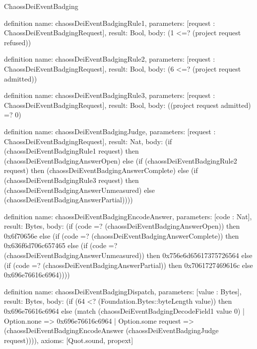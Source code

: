 \begin{lexlean}{ChaossDeiEventBadging}
\begin{semanticmodule}
definition{
  name: chaossDeiEventBadgingRule1,
  parameters: [request : ChaossDeiEventBadgingRequest],
  result: Bool,
  body: (1 <=? (project request refused))
}

definition{
  name: chaossDeiEventBadgingRule2,
  parameters: [request : ChaossDeiEventBadgingRequest],
  result: Bool,
  body: (6 <=? (project request admitted))
}

definition{
  name: chaossDeiEventBadgingRule3,
  parameters: [request : ChaossDeiEventBadgingRequest],
  result: Bool,
  body: ((project request admitted) =? 0)
}

definition{
  name: chaossDeiEventBadgingJudge,
  parameters: [request : ChaossDeiEventBadgingRequest],
  result: Nat,
  body: (if (chaossDeiEventBadgingRule1 request) then (chaossDeiEventBadgingAnswerOpen) else (if (chaossDeiEventBadgingRule2 request) then (chaossDeiEventBadgingAnswerComplete) else (if (chaossDeiEventBadgingRule3 request) then (chaossDeiEventBadgingAnswerUnmeasured) else (chaossDeiEventBadgingAnswerPartial))))
}

definition{
  name: chaossDeiEventBadgingEncodeAnswer,
  parameters: [code : Nat],
  result: Bytes,
  body: (if (code =? (chaossDeiEventBadgingAnswerOpen)) then 0x6f70656e else (if (code =? (chaossDeiEventBadgingAnswerComplete)) then 0x636f6d706c657465 else (if (code =? (chaossDeiEventBadgingAnswerUnmeasured)) then 0x756e6d65617375726564 else (if (code =? (chaossDeiEventBadgingAnswerPartial)) then 0x7061727469616c else 0x696e76616c6964))))
}

definition{
  name: chaossDeiEventBadgingDispatch,
  parameters: [value : Bytes],
  result: Bytes,
  body: (if (64 <? (Foundation.Bytes::byteLength value)) then 0x696e76616c6964 else (match (chaossDeiEventBadgingDecodeField1 value 0)
    | Option.none => 0x696e76616c6964
    | Option.some request => (chaossDeiEventBadgingEncodeAnswer (chaossDeiEventBadgingJudge request)))),
  axioms: [Quot.sound, propext]
}
\end{semanticmodule}
\end{lexlean}
